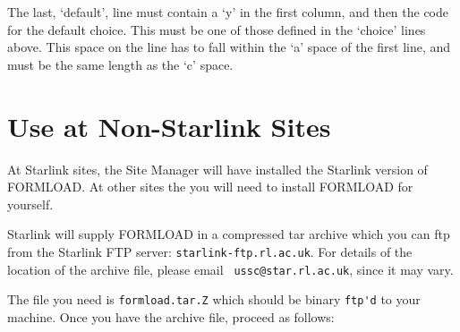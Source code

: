 The last, `default', line must contain a `y' in the first column, and then
the code for the default choice. This must be one of those defined in the
`choice' lines above. This space on the line has to fall within the `a'
space of the first line, and must be the same length as the `c' space. 


\section{Use at Non-Starlink Sites}

At Starlink sites, the Site Manager will have installed the Starlink
version of FORMLOAD.  At other sites the you will need to install
FORMLOAD for yourself.

Starlink will supply FORMLOAD in a compressed tar archive which you can
ftp from the Starlink FTP server: {\tt starlink-ftp.rl.ac.uk}. For
details of the location of the archive file, please email {\tt
ussc@star.rl.ac.uk}, since it may vary.

The file you need is \verb|formload.tar.Z| which should be binary 
\verb|ftp'd| to your machine.  Once you have the archive file, proceed as 
follows:

